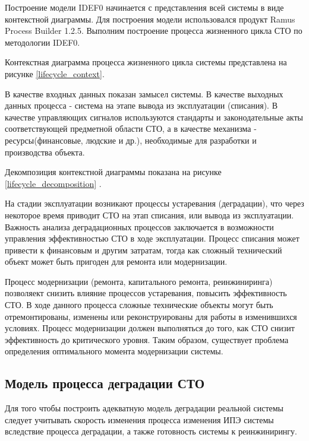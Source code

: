 Построение модели IDEF0 начинается с представления всей системы в виде контекстной диаграммы.
Для построения модели использовался продукт Ramus Process Builder 1.2.5. 
Выполним построение процесса жизненного цикла СТО по методологии IDEF0. 

Контекстная диаграмма процесса жизненного цикла системы представлена на рисунке \ref{lifecycle_context}.

В качестве входных данных показан замысел системы. В качестве выходных данных процесса - система на этапе вывода из эксплуатации (списания).
В качестве управляющих сигналов используются стандарты и законодательные акты соответствующей предметной области СТО, а в качестве механизма - ресурсы(финансовые, людские и др.), необходимые для разработки и производства объекта.

Декомпозиция контекстной диаграммы показана на рисунке \ref{lifecycle_decomposition}
.

На стадии эксплуатации возникают процессы устаревания (деградации), что через некоторое время приводит СТО на этап списания, или вывода из эксплуатации.
Важность анализа деградационных процессов заключается в возможности управления эффективностью СТО в ходе эксплуатации.
Процесс списания может привести к финансовым и другим затратам, тогда как сложный технический объект может быть пригоден для ремонта или модернизации.

Процесс модернизации (ремонта, капитального ремонта, реинжиниринга) позволяект снизить влияние процессов устаревания, 
повысить эффективность СТО. В ходе данного процесса сложные технические объекты могут быть отремонтированы, изменены или реконструированы для работы в изменившихся условиях.
Процесс модернизации должен выполняться до того, как СТО снизит эффективность до критического уровня.
Таким образом, существует проблема определения оптимального момента модернизации системы.

\subsection{Модель процесса деградации СТО}
Для того чтобы построить адекватную модель деградации реальной системы следует учитывать скорость изменения процесса изменения ИПЭ системы вследствие процесса деградации, а также готовность системы к реинжинирингу. 

